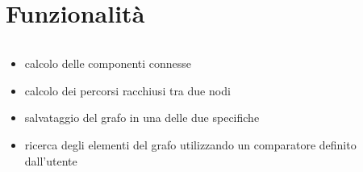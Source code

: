 \documentclass{beamer}
\begin{document}
\section{Funzionalità}
\begin{frame}{\secname}
	\begin{columns}
		\begin{column}{\textwidth}
			\begin{itemize}
				\item calcolo delle componenti connesse
				\item calcolo dei percorsi racchiusi tra due nodi
				\item salvataggio del grafo in una delle due specifiche
				\item ricerca degli elementi del grafo utilizzando un comparatore
					definito dall'utente
			\end{itemize}
		\end{column}
	\end{columns}
\end{frame}

\end{document}
